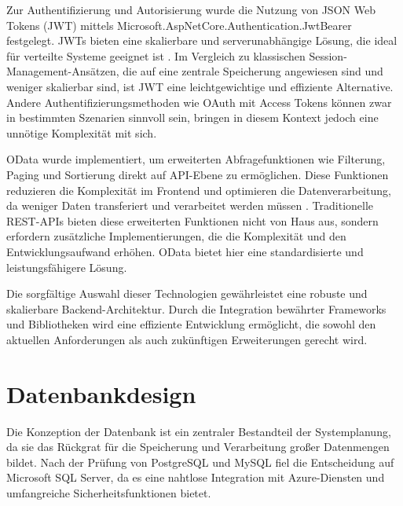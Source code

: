 Zur Authentifizierung und Autorisierung wurde die Nutzung von JSON Web Tokens (JWT) mittels Microsoft.AspNetCore.Authentication.JwtBearer festgelegt. JWTs bieten eine skalierbare und serverunabhängige Lösung, die ideal für verteilte Systeme geeignet ist \cite{jwtAuthDocs}. Im Vergleich zu klassischen Session-Management-Ansätzen, die auf eine zentrale Speicherung angewiesen sind und weniger skalierbar sind, ist JWT eine leichtgewichtige und effiziente Alternative. Andere Authentifizierungsmethoden wie OAuth mit Access Tokens können zwar in bestimmten Szenarien sinnvoll sein, bringen in diesem Kontext jedoch eine unnötige Komplexität mit sich.

OData wurde implementiert, um erweiterten Abfragefunktionen wie Filterung, Paging und Sortierung direkt auf API-Ebene zu ermöglichen. Diese Funktionen reduzieren die Komplexität im Frontend und optimieren die Datenverarbeitung, da weniger Daten transferiert und verarbeitet werden müssen \cite{odata2022}. Traditionelle REST-APIs bieten diese erweiterten Funktionen nicht von Haus aus, sondern erfordern zusätzliche Implementierungen, die die Komplexität und den Entwicklungsaufwand erhöhen. OData bietet hier eine standardisierte und leistungsfähigere Lösung.

Die sorgfältige Auswahl dieser Technologien gewährleistet eine robuste und skalierbare Backend-Architektur. Durch die Integration bewährter Frameworks und Bibliotheken wird eine effiziente Entwicklung ermöglicht, die sowohl den aktuellen Anforderungen als auch zukünftigen Erweiterungen gerecht wird.

\section{Datenbankdesign}
Die Konzeption der Datenbank ist ein zentraler Bestandteil der Systemplanung, da sie das Rückgrat für die Speicherung und Verarbeitung großer Datenmengen bildet. Nach der Prüfung von PostgreSQL und MySQL fiel die Entscheidung auf Microsoft SQL Server, da es eine nahtlose Integration mit Azure-Diensten und umfangreiche Sicherheitsfunktionen bietet.

